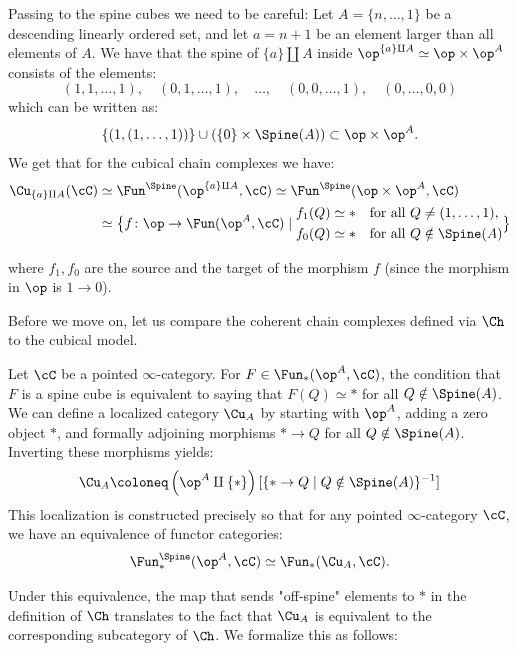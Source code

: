 Passing to the spine cubes we need to be careful:
Let $A=\{n, \dots, 1\}$ be a descending linearly ordered set, and let $a = n+1$ be an element larger than all elements of $A$. We have that the spine of $\{a\} \amalg A$ inside $\op^{\{a\} \amalg A} \simeq \op \times \op^A$ consists of the elements:
\[
    (1, 1, \dots, 1), \quad (0, 1, \dots, 1), \quad \dots, \quad (0, 0, \dots, 1), \quad (0, \dots, 0, 0)
\]
which can be written as:
\[
    \{ (1, (1, \dots, 1)) \} \cup \left( \{0\} \times \Spine(A) \right) \subset \op \times \op^A.
\]
We get that for the cubical chain complexes we have:
\begin{equation}\label{eq:spine_equivalence}
\begin{aligned}
    \Cu_{\{a\} \amalg A}(\cC) &\simeq \Fun^{\Spine}(\op^{\{a\} \amalg A},\cC) \simeq \Fun^{\Spine}(\op \times \op^{A},\cC) \\
    &\simeq \big\{f \colon \op \to \Fun(\op^A, \cC) \mid
    \begin{aligned}
        f_1(Q) &\simeq * \quad \text{for all } Q \neq (1, \dots, 1), \\
        f_0(Q) &\simeq * \quad \text{for all } Q \notin \Spine(A)
    \end{aligned}
     \big\}
\end{aligned}
\end{equation}

where $f_1, f_0$ are the source and the target of the morphism $f$ (since the morphism in $\op$ is $1 \to 0$).

Before we move on, let us compare the coherent chain complexes defined via $\Ch$ to the cubical model.

Let $\cC$ be a pointed $\infty$-category. For $F \in \Fun_*(\op^A,\cC)$, the condition that $F$ is a spine cube is equivalent to saying that $F(Q) \simeq \ast$ for all $Q \notin \Spine(A)$.
We can define a localized category $\Cu_A$ by starting with $\op^A$, adding a zero object $\ast$, and formally adjoining morphisms $\ast \to Q$ for all $Q \notin \Spine(A)$. Inverting these morphisms yields:
\[
    \Cu_A \coloneq \left( \op^A \amalg \{\ast\} \right) [\{\ast \to Q \mid Q \notin \Spine(A)\}^{-1}]
\]
This localization is constructed precisely so that for any pointed $\infty$-category $\cC$, we have an equivalence of functor categories:
\[
    \Fun_*^{\Spine}(\op^A,\cC) \simeq \Fun_*(\Cu_A, \cC).
\]

Under this equivalence, the map that sends "off-spine" elements to $\ast$ in the definition of $\Ch$ translates to the fact that $\Cu_A$ is equivalent to the corresponding subcategory of $\Ch$. We formalize this as follows:

